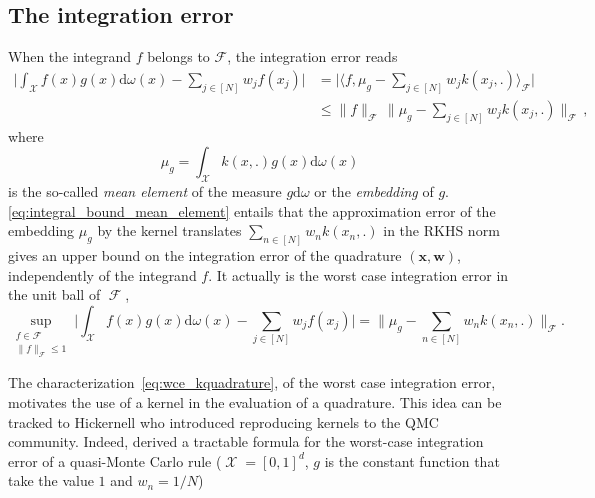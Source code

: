 \documentclass[twoside,11pt]{book}
\numberwithin{theorem}{chapter}
\numberwithin{definition}{chapter}
\numberwithin{proposition}{chapter}
\numberwithin{corollary}{chapter}
\numberwithin{example}{chapter}
\numberwithin{lemma}{chapter}
\numberwithin{assumption}{chapter}
\numberwithin{equation}{chapter}
\numberwithin{figure}{chapter}
\DeclareMathOperator{\Tran}{\intercal}
\DeclareMathOperator{\F}{\mathcal{F}}
\DeclareMathOperator{\X}{\mathcal{X}}
\begin{document}


\subsection{The integration error}
\label{subsec:int_error}
When the integrand $f$ belongs to $\mathcal{F}$, the integration error reads \parencite{SmGrSoSc07}
\begin{align}
\label{eq:integral_bound_mean_element}
  \bigg|\int_{\mathcal{X}} f(x)g(x)\mathrm{d}\omega(x) - \sum\limits_{j \in [N]} w_{j}f(x_{j}) \bigg|
  & = \bigg|\langle f, \mu_{g} - \sum\limits_{j \in [N]} w_{j} k(x_{j},.) \rangle_{\mathcal{F}} \bigg|\nonumber\\
  & \leq \|f\|_{\mathcal{F}} \, \Big\|\mu_{g} - \sum\limits_{j \in [N]} w_{j} k(x_{j},.)\Big\|_{\mathcal{F}}\,,
\end{align}
where
\begin{equation}
\mu_{g} = \int_{\mathcal{X}} k(x,.) g(x) \mathrm{d}\omega(x)
\end{equation}
 is the so-called \emph{mean element} \parencite{DiPi14,MuFuSrSc17} of the measure $g \mathrm{d}\omega$ or the \emph{embedding} of $g$. \eqref{eq:integral_bound_mean_element} entails that the approximation error of the embedding $\mu_{g}$ by the kernel translates $\sum_{n \in [N]} w_{n}k(x_{n},.)$ in the RKHS norm gives an upper bound on the integration error of the quadrature $(\bm{x}, \bm{w})$, independently of the integrand $f$. It actually is the worst case integration error in the unit ball of $\F$,
\begin{equation}\label{eq:wce_kquadrature}
\sup\limits_{\substack{f \in \mathcal{F}\\ \|f\|_{\mathcal{F}} \leq 1}} \bigg|\int_{\mathcal{X}} f(x)g(x)\mathrm{d}\omega(x) - \sum\limits_{j \in [N]} w_{j}f(x_{j}) \bigg| = \|\mu_{g} - \sum\limits_{n \in [N]}w_{n} k(x_{n},.) \|_{\mathcal{F}}.
\end{equation}




The characterization~\eqref{eq:wce_kquadrature}, of the worst case integration error, motivates the use of a kernel in the evaluation of a quadrature. This idea can be tracked to Hickernell \parencite{Hic96,Hic98} who introduced reproducing kernels to the QMC community. Indeed, \cite{Hic96} derived a tractable formula for the worst-case integration error of a quasi-Monte Carlo rule ($\X=[0,1]^{d}$, $g$ is the constant function that take the value $1$ and $w_{n}= 1/N$)
\end{document}
